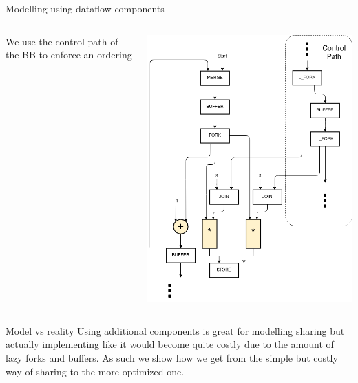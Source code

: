 \documentclass{beamer}
\begin{document}
\begin{frame}{Modelling using dataflow components}
    \begin{columns}[T]
    \begin{column}{0.3\textwidth}
    We use the control path of the BB to enforce an ordering
    \end{column}
    \begin{column}{0.45\textwidth}
        \begin{center}
      \includegraphics[scale=0.25]{dataflow_shared.png}
    \end{center}
    \end{column}
  \end{columns}\end{frame}

\begin{frame}{Model vs reality}
Using additional components is great for modelling sharing but actually implementing like it would become quite costly due to the amount of lazy forks and buffers. As such we show how we get from the simple but costly way of sharing to the more optimized one.
\end{frame}
\end{document}
